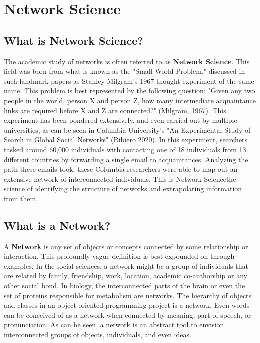 \documentclass{article}
\begin{document}
\section{Network Science}

\subsection{What is Network Science?}
The academic study of networks is often referred to as \textbf{Network Science}. This field was born from what is known as the "Small World Problem,"
discussed in such landmark papers as Stanley Milgram's 1967 thought experiment of the same name. This problem is best represented by the following question:
"Given any two people in the world, person X and person Z, how many intermediate acquaintance links are required before X and Z are connected?" (Milgram, 1967). This experiment has been
pondered extensively, and even carried out by multiple universities, as can be seen in Columbia University's "An Experimental Study of Search in Global Social Networks" (Ribiero 2020). In this experiment,
searchers tasked around 60,000 individuals with contacting one of 18 individuals from 13 different countries by forwarding a single email to acquaintances. Analyzing the path these emails took,
these Columbia researchers were able to map out an extensive network of interconnected individuals. This is Network Science\textemdash the science of identifying the structure of networks and extrapolating information
from them.

\subsection{What is a Network?}
A \textbf{Network} is any set of objects or concepts connected by some relationship or interaction. 
This profoundly vague definition is best expounded on through examples. In the social sciences, a network might be a group of individuals that are related by family, friendship, work, location, academic co-authorship or any other social bond. 
In biology, the interconnected parts of the brain or even the set of proteins responsible for metabolism are networks. 
The hierarchy of objects and classes in an object-oriented programming project is a network. 
Even words can be conceived of as a network when connected by meaning, part of speech, or pronunciation. As can be seen, a network is an abstract tool to envision 
interconnected groups of objects, individuals, and even ideas.   
\end{document}
